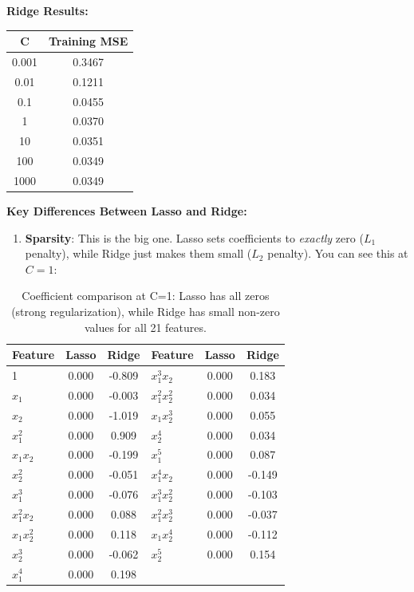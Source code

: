 \documentclass[11pt,a4paper]{article}
\begin{document}
\textbf{Ridge Results:}

\begin{table}[H]
\centering
\begin{tabular}{cc}
\toprule
C & Training MSE \\
\midrule
0.001 & 0.3467 \\
0.01 & 0.1211 \\
0.1 & 0.0455 \\
1 & 0.0370 \\
10 & 0.0351 \\
100 & 0.0349 \\
1000 & 0.0349 \\
\bottomrule
\end{tabular}
\end{table}

\textbf{Key Differences Between Lasso and Ridge:}

\begin{enumerate}
    \item \textbf{Sparsity}: This is the big one. Lasso sets coefficients to \textit{exactly} zero ($L_1$ penalty), while Ridge just makes them small ($L_2$ penalty). You can see this at $C=1$:
\end{enumerate}

\begin{table}[H]
\centering
\small
\begin{tabular}{lcc|lcc}
\toprule
Feature & Lasso & Ridge & Feature & Lasso & Ridge \\
\midrule
1 & 0.000 & -0.809 & $x_1^3x_2$ & 0.000 & 0.183 \\
$x_1$ & 0.000 & -0.003 & $x_1^2x_2^2$ & 0.000 & 0.034 \\
$x_2$ & 0.000 & -1.019 & $x_1x_2^3$ & 0.000 & 0.055 \\
$x_1^2$ & 0.000 & 0.909 & $x_2^4$ & 0.000 & 0.034 \\
$x_1x_2$ & 0.000 & -0.199 & $x_1^5$ & 0.000 & 0.087 \\
$x_2^2$ & 0.000 & -0.051 & $x_1^4x_2$ & 0.000 & -0.149 \\
$x_1^3$ & 0.000 & -0.076 & $x_1^3x_2^2$ & 0.000 & -0.103 \\
$x_1^2x_2$ & 0.000 & 0.088 & $x_1^2x_2^3$ & 0.000 & -0.037 \\
$x_1x_2^2$ & 0.000 & 0.118 & $x_1x_2^4$ & 0.000 & -0.112 \\
$x_2^3$ & 0.000 & -0.062 & $x_2^5$ & 0.000 & 0.154 \\
$x_1^4$ & 0.000 & 0.198 & & & \\
\bottomrule
\end{tabular}
\caption*{Coefficient comparison at C=1: Lasso has all zeros (strong regularization), while Ridge has small non-zero values for all 21 features.}
\end{table}
\end{document}
